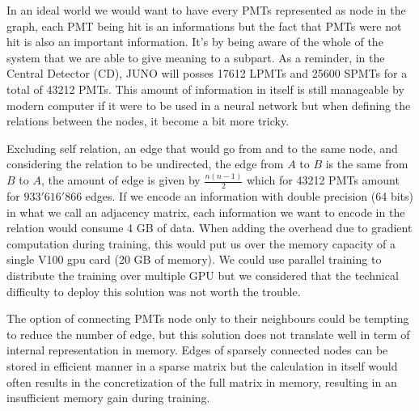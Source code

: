 \documentclass[../main.tex]{subfiles}
\begin{document}
In an ideal world we would want to have every PMTs represented as node in the graph, each PMT being hit is an informations but the fact that PMTs were not hit is also an important information. It's by being aware of the whole of the system that we are able to give meaning to a subpart. As a reminder, in the Central Detector (CD), JUNO will posses 17612 LPMTs and 25600 SPMTs for a total of 43212 PMTs. This amount of information in itself is still manageable by modern computer if it were to be used in a neural network but when defining the relations between the nodes, it become a bit more tricky.

Excluding self relation, an edge that would go from and to the same node, and considering the relation to be undirected, the edge from $A$ to $B$ is the same from $B$ to $A$, the amount of edge is given by $\frac{n(n-1)}{2}$ which for 43212 PMTs amount for $933'616'866$ edges. If we encode an information with double precision (64 bits) in what we call an adjacency matrix, each information we want to encode in the relation would consume 4 GB of data. When adding the overhead due to gradient computation during training, this would put us over the memory capacity of a single V100 gpu card (20 GB of memory). We could use parallel training to distribute the training over multiple GPU but we considered that the technical difficulty to deploy this solution was not worth the trouble.

The option of connecting PMTs node only to their neighbours could be tempting to reduce the number of edge, but this solution does not translate well in term of internal representation in memory. Edges of sparsely connected nodes can be stored in efficient manner in a sparse matrix but the calculation in itself would often results in the concretization of the full matrix in memory, resulting in an insufficient memory gain during training.
\end{document}
